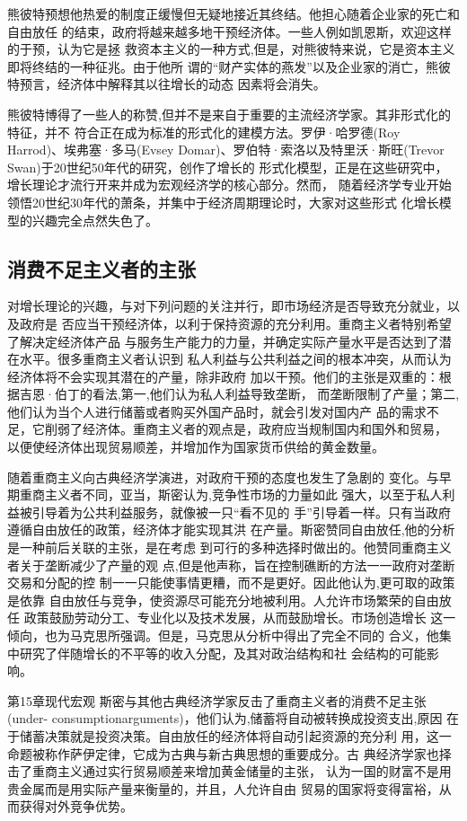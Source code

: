 熊彼特预想他热爱的制度正缓慢但无疑地接近其终结。他担心随着企业家的死亡和自由放任
的结束，政府将越来越多地干预经济体。一些人例如凯恩斯，欢迎这样的于预，认为它是拯
救资本主义的一种方式,但是，对熊彼特来说，它是资本主义即将终结的一种征兆。由于他所
谓的“财产实体的燕发”以及企业家的消亡，熊彼特预言，经济体中解释其以往增长的动态
因素将会消失。

熊彼特博得了一些人的称赞,但并不是来自于重要的主流经济学家。其非形式化的特征，并不
符合正在成为标准的形式化的建模方法。罗伊·哈罗德(Roy Harrod)、埃弗塞·多马(Evsey
Domar)、罗伯特·索洛以及特里沃·斯旺(Trevor Swan)于20世纪50年代的研究，创作了增长的
形式化模型，正是在这些研究中，增长理论才流行开来并成为宏观经济学的核心部分。然而，
随着经济学专业开始领悟20世纪30年代的萧条，并集中于经济周期理论时，大家对这些形式
化增长模型的兴趣完全点然失色了。

\subsection{消费不足主义者的主张}

对增长理论的兴趣，与对下列问题的关注并行，即市场经济是否导致充分就业，以及政府是
否应当干预经济体，以利于保持资源的充分利用。重商主义者特别希望了解决定经济体产品
与服务生产能力的力量，并确定实际产量水平是否达到了潜在水平。很多重商主义者认识到
私人利益与公共利益之间的根本冲突，从而认为经济体将不会实现其潜在的产量，除非政府
加以干预。他们的主张是双重的：根据吉恩·伯丁的看法,第一,他们认为私人利益导致垄断，
而垄断限制了产量；第二,他们认为当个人进行储蓄或者购买外国产品时，就会引发对国内产
品的需求不足，它削弱了经济体。重商主义者的观点是，政府应当规制国内和国外和贸易，
以便使经济体出现贸易顺差，并增加作为国家货币供给的黄金数量。

随着重商主义向古典经济学演进，对政府干预的态度也发生了急剧的
变化。与早期重商主义者不同，亚当，斯密认为,竞争性市场的力量如此
强大，以至于私人利益被引导着为公共利益服务，就像被一只“看不见的
手”引导着一样。只有当政府遵循自由放任的政策，经济体才能实现其洪
在产量。斯密赞同自由放任,他的分析是一种前后关联的主张，是在考虑
到可行的多种选择时做出的。他赞同重商主义者关于垄断减少了产量的观
点,但是他声称，旨在控制礁断的方法一一政府对垄断交易和分配的控
制一一只能使事情更糟，而不是更好。因此他认为,更可取的政策是依靠
自由放任与竞争，使资源尽可能充分地被利用。人允许市场繁荣的自由放任
政策鼓励劳动分工、专业化以及技术发展，从而鼓励增长。市场创造增长
这一倾向，也为马克思所强调。但是，马克思从分析中得出了完全不同的
合义，他集中研究了伴随增长的不平等的收入分配，及其对政治结构和社
会结构的可能影响。

第15章现代宏观
斯密与其他古典经济学家反击了重商主义者的消费不足主张(under-
consumptionarguments)，他们认为,储蓄将自动被转换成投资支出,原因
在于储蓄决策就是投资决策。自由放任的经济体将自动引起资源的充分利
用，这一命题被称作萨伊定律，它成为古典与新古典思想的重要成分。古
典经济学家也择击了重商主义通过实行贸易顺差来增加黄金储量的主张，
认为一国的财富不是用贵金属而是用实际产量来衡量的，并且，人允许自由
贸易的国家将变得富裕，从而获得对外竞争优势。

